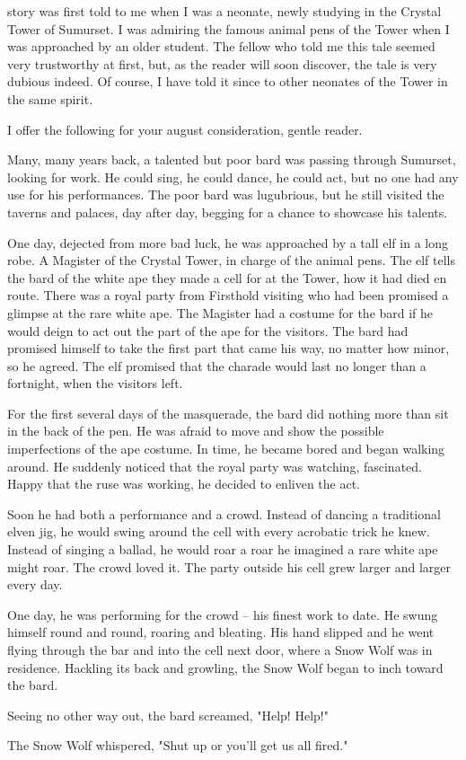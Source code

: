 
 story was first told to me when I was a neonate, newly studying in the Crystal Tower of Sumurset. I was admiring the famous animal pens of the Tower when I was approached by an older student. The fellow who told me this tale seemed very trustworthy at first, but, as the reader will soon discover, the tale is very dubious indeed. Of course, I have told it since to other neonates of the Tower in the same spirit.

I offer the following for your august consideration, gentle reader.

Many, many years back, a talented but poor bard was passing through Sumurset, looking for work. He could sing, he could dance, he could act, but no one had any use for his performances. The poor bard was lugubrious, but he still visited the taverns and palaces, day after day, begging for a chance to showcase his talents.

One day, dejected from more bad luck, he was approached by a tall elf in a long robe. A Magister of the Crystal Tower, in charge of the animal pens. The elf tells the bard of the white ape they made a cell for at the Tower, how it had died en route. There was a royal party from Firsthold visiting who had been promised a glimpse at the rare white ape. The Magister had a costume for the bard if he would deign to act out the part of the ape for the visitors. The bard had promised himself to take the first part that came his way, no matter how minor, so he agreed. The elf promised that the charade would last no longer than a fortnight, when the visitors left.

For the first several days of the masquerade, the bard did nothing more than sit in the back of the pen. He was afraid to move and show the possible imperfections of the ape costume. In time, he became bored and began walking around. He suddenly noticed that the royal party was watching, fascinated. Happy that the ruse was working, he decided to enliven the act.

Soon he had both a performance and a crowd. Instead of dancing a traditional elven jig, he would swing around the cell with every acrobatic trick he knew. Instead of singing a ballad, he would roar a roar he imagined a rare white ape might roar. The crowd loved it. The party outside his cell grew larger and larger every day.

One day, he was performing for the crowd -- his finest work to date. He swung himself round and round, roaring and bleating. His hand slipped and he went flying through the bar and into the cell next door, where a Snow Wolf was in residence. Hackling its back and growling, the Snow Wolf began to inch toward the bard.

Seeing no other way out, the bard screamed, "Help! Help!"

The Snow Wolf whispered, "Shut up or you'll get us all fired."